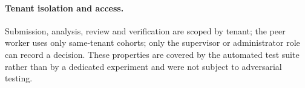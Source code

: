 

\paragraph{Tenant isolation and access.}
Submission, analysis, review and verification are scoped by tenant; the peer
worker uses only same-tenant cohorts; only the supervisor or administrator role can record a
decision. These properties are covered by the automated test suite rather than by
a dedicated experiment and were not subject to adversarial testing.
